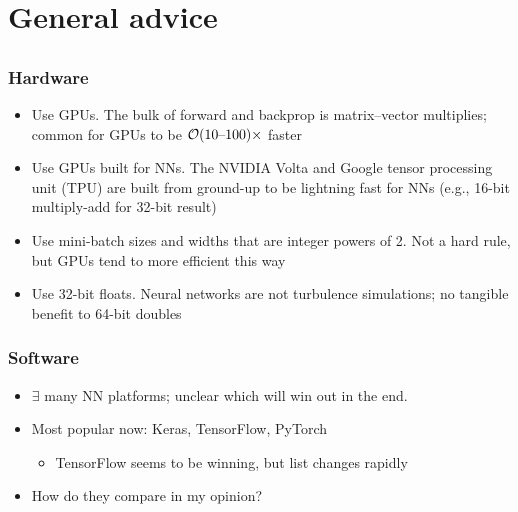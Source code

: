 \section[Advice]{General advice}

\subsection{}

\begin{frame}
    \frametitle{Hardware}

    \begin{itemize}
        \item \alert{Use GPUs.}
        The bulk of forward and backprop is matrix--vector multiplies; common for GPUs to be $\mathcal{O}(10 \text{--} 100)\times$ faster
        \item \alert{Use GPUs built for NNs.}
        The NVIDIA Volta and Google tensor processing unit (TPU) are built from ground-up to be lightning fast for NNs (e.g., 16-bit multiply-add for 32-bit result)
        \item \alert{Use mini-batch sizes and widths that are integer powers of 2.}
        Not a hard rule, but GPUs tend to more efficient this way
        \item \alert{Use 32-bit floats.}
        Neural networks are not turbulence simulations; no tangible benefit to 64-bit doubles
    \end{itemize}
\end{frame}

\begin{frame}
    \frametitle{Software}

    \begin{itemize}
        \item $\exists$ many NN platforms; unclear which will win out in the end.
        \item Most popular now: Keras, TensorFlow, PyTorch
        \begin{itemize}
            \item TensorFlow seems to be winning, but list changes rapidly
        \end{itemize}
        \item How do they compare in my opinion?
    \end{itemize}

    \begin{center}
        
    \end{center}
\end{frame}

